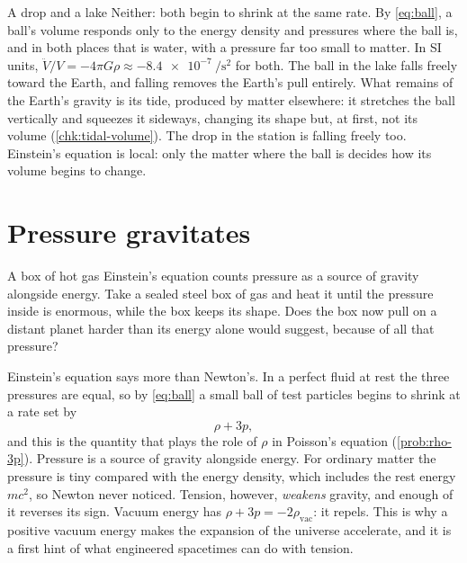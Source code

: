 \begin{revisited}{A drop and a lake}
Neither: both begin to shrink at the same rate. By \cref{eq:ball}, a ball's
volume responds only to the energy density and pressures where the ball is,
and in both places that is water, with a pressure far too small to matter. In
SI units, $\ddot V/V = -4\pi G\rho \approx \SI{-8.4e-7}{\per\second\squared}$
for both. The ball in the lake falls freely toward the Earth, and falling
removes the Earth's pull entirely. What remains of the Earth's gravity is its
tide, produced by matter elsewhere: it stretches the ball vertically and
squeezes it sideways, changing its shape but, at first, not its volume
(\cref{chk:tidal-volume}). The drop in the station is falling freely too.
Einstein's equation is local: only the matter where the ball is decides how
its volume begins to change.
\end{revisited}

\section{Pressure gravitates}\label{sec:pressure}

\begin{thought}{A box of hot gas}
Einstein's equation counts pressure as a source of gravity alongside energy.
Take a sealed steel box of gas and heat it until the pressure inside is
enormous, while the box keeps its shape. Does the box now pull on a distant planet harder than its energy
alone would suggest, because of all that pressure?
\end{thought}

Einstein's equation says more than Newton's. In a perfect fluid at rest the
three pressures are equal, so by \cref{eq:ball} a small ball of test particles
begins to shrink at a rate set by
\begin{equation}
  \rho + 3p ,
  \label{eq:active-mass}
\end{equation}
and this is the quantity that plays the role of $\rho$ in Poisson's equation
(\cref{prob:rho-3p}).
Pressure is a source of gravity alongside energy. For ordinary matter the
pressure is tiny compared with the energy density, which includes the rest
energy $mc^{2}$, so Newton never noticed. Tension, however, \emph{weakens}
gravity, and enough of it reverses its sign. Vacuum energy has
$\rho + 3p = -2\rho_{\text{vac}}$: it repels. This is why a positive vacuum
energy makes the expansion of the universe accelerate, and it is a first hint
of what engineered spacetimes can do with tension.

